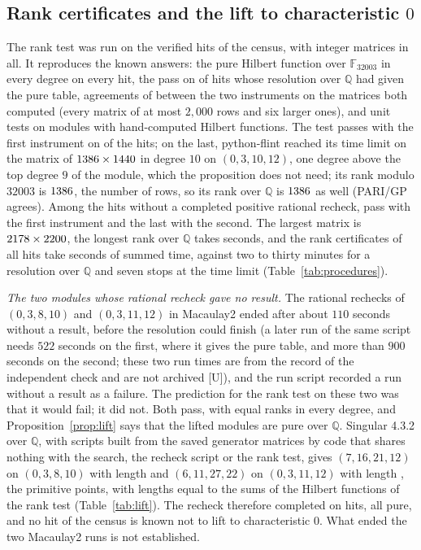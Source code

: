 \documentclass[11pt]{article}
\theoremstyle{definition}
\theoremstyle{remark}
\newcommand{\Q}{\mathbb{Q}}
\newcommand{\F}{\mathbb{F}}
\begin{document}
\subsection{Rank certificates and the lift to characteristic \texorpdfstring{$0$}{0}}
\label{sec:lift-results}

The rank test was run on the \nfourHits{} verified hits of the census, with \nfourMatrices{} integer matrices in all. It reproduces the known answers: the pure Hilbert function over $\F_{32003}$ in every degree on every hit, the pass on \nfourKnown{} of \nfourKnown{} hits whose resolution over $\Q$ had given the pure table, \nfourAgree{} agreements of \nfourCompared{} between the two instruments on the matrices both computed (every matrix of at most $2{,}000$ rows and six larger ones), and \nfourUnitTests{} unit tests on modules with hand-computed Hilbert functions. The test passes with the first instrument on \nfourPassOne{} of the \nfourHits{} hits; on the last, python-flint reached its time limit on the matrix of $1386\times1440$ in degree $10$ on $(0,3,10,12)$, one degree above the top degree $9$ of the module, which the proposition does not need; its rank modulo $32003$ is $1386$, the number of rows, so its rank over $\Q$ is $1386$ as well (PARI/GP agrees). Among the \nfourRest{} hits without a completed positive rational recheck, \nfourRestPass{} pass with the first instrument and the last with the second. The largest matrix is $2178\times2200$, the longest rank over $\Q$ takes \nfourLongestSec{} seconds, and the rank certificates of all \nfourHits{} hits take \nfourTotalSec{} seconds of summed time, against two to thirty minutes for a resolution over $\Q$ and seven stops at the time limit (Table~\ref{tab:procedures}).

\emph{The two modules whose rational recheck gave no result.} The rational rechecks of $(0,3,8,10)$ and $(0,3,11,12)$ in Macaulay2 ended after about $110$ seconds without a result, before the resolution could finish (a later run of the same script needs $522$ seconds on the first, where it gives the pure table, and more than $900$ seconds on the second; these two run times are from the record of the independent check and are not archived [U]), and the run script recorded a run without a result as a failure. The prediction for the rank test on these two was that it would fail; it did not. Both pass, with equal ranks in every degree, and Proposition~\ref{prop:lift} says that the lifted modules are pure over $\Q$. Singular 4.3.2 over $\Q$, with scripts built from the saved generator matrices by code that shares nothing with the search, the recheck script or the rank test, gives $(7,16,21,12)$ on $(0,3,8,10)$ with length \nfourLenA{} and $(6,11,27,22)$ on $(0,3,11,12)$ with length \nfourLenB{}, the primitive points, with lengths equal to the sums of the Hilbert functions of the rank test (Table~\ref{tab:lift}). The recheck therefore completed on \nqqOk{} hits, all pure, and no hit of the census is known not to lift to characteristic $0$. What ended the two Macaulay2 runs is not established.
\end{document}
